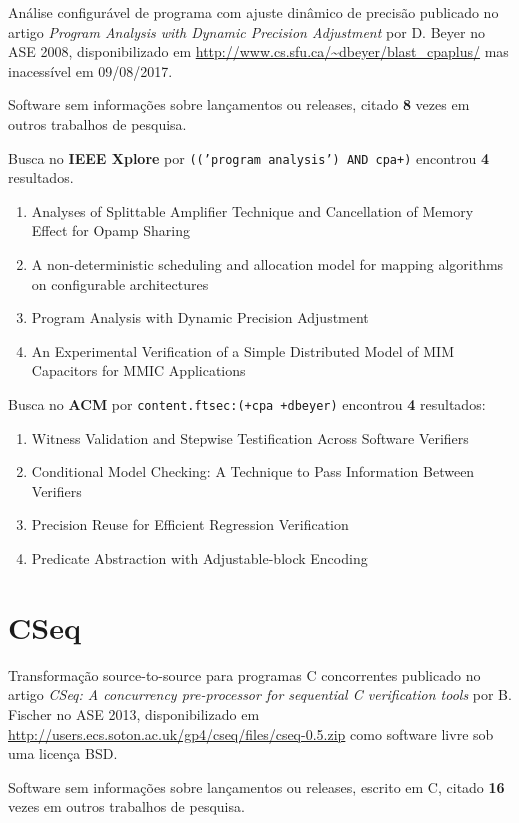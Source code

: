 Análise configurável de programa com ajuste dinâmico de precisão
publicado no artigo {\it Program Analysis with Dynamic Precision Adjustment}
por D. Beyer
no ASE 2008,
disponibilizado em \url{http://www.cs.sfu.ca/~dbeyer/blast_cpaplus/}
mas inacessível em 09/08/2017.

Software sem informações sobre lançamentos ou releases,
citado {\bf 8} vezes em outros trabalhos de pesquisa.

Busca no {\bf IEEE Xplore} por
\texttt{(('program analysis') AND cpa+)}
encontrou {\bf 4}
resultados.

\begin{enumerate}
\item Analyses of Splittable Amplifier Technique and Cancellation of Memory Effect for Opamp Sharing
\item A non-deterministic scheduling and allocation model for mapping algorithms on configurable architectures
\item Program Analysis with Dynamic Precision Adjustment
\item An Experimental Verification of a Simple Distributed Model of MIM Capacitors for MMIC Applications
\end{enumerate}

Busca no {\bf ACM} por
\texttt{content.ftsec:(+cpa +dbeyer)}
encontrou {\bf 4}
resultados:

\begin{enumerate}
\item Witness Validation and Stepwise Testification Across Software Verifiers
\item Conditional Model Checking: A Technique to Pass Information Between Verifiers
\item Precision Reuse for Efficient Regression Verification
\item Predicate Abstraction with Adjustable-block Encoding
\end{enumerate}

\section{CSeq}

Transformação source-to-source para programas C concorrentes
publicado no artigo {\it CSeq: A concurrency pre-processor for sequential C verification tools}
por B. Fischer
no ASE 2013,
disponibilizado em \url{http://users.ecs.soton.ac.uk/gp4/cseq/files/cseq-0.5.zip}
como software livre
sob uma licença BSD.

Software sem informações sobre lançamentos ou releases,
escrito em C,
citado {\bf 16} vezes em outros trabalhos de pesquisa.

